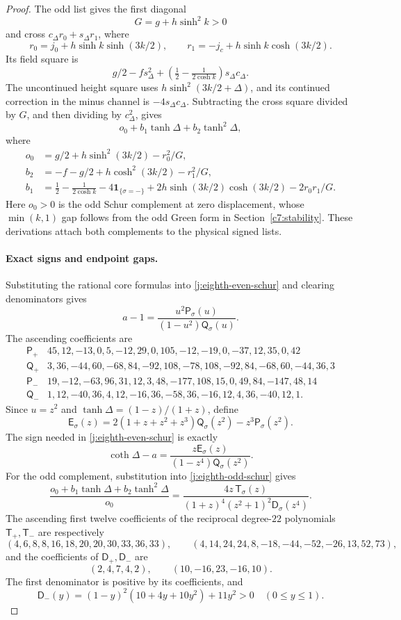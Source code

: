 \begin{proof}
The odd list gives the first diagonal
\[
G=g+h\sinh^2 k>0
\]
and cross \(c_\Delta r_0+s_\Delta r_1\), where
\[
r_0=j_0+h\sinh k\sinh(3k/2),\qquad
r_1=-j_c+h\sinh k\cosh(3k/2).
\]
Its field square is
\[
g/2-fs_\Delta^2+
\left(\tfrac12-\tfrac1{2\cosh k}\right)s_\Delta c_\Delta.
\]
The uncontinued height square uses
\(h\sinh^2(3k/2+\Delta)\), and its continued correction in the minus channel is
\(-4s_\Delta c_\Delta\). Subtracting the cross square divided by \(G\), and then dividing by \(c_\Delta^2\), gives
\begin{equation}\label{j:eighth-odd-schur}
o_0+b_1\tanh\Delta+b_2\tanh^2\Delta,
\end{equation}
where
\[
\begin{aligned}
o_0&=g/2+h\sinh^2(3k/2)-r_0^2/G,\\
b_2&=-f-g/2+h\cosh^2(3k/2)-r_1^2/G,\\
b_1&=\tfrac12-\tfrac1{2\cosh k}-4\mathbf1_{\{\sigma=-\}}
+2h\sinh(3k/2)\cosh(3k/2)-2r_0r_1/G.
\end{aligned}
\]
Here \(o_0>0\) is the odd Schur complement at zero displacement, whose \(\min(k,1)\) gap follows from the odd Green form in Section~\ref{c7:stability}. These derivations attach both complements to the physical signed lists.

\paragraph{Exact signs and endpoint gaps.}
Substituting the rational core formulas into \eqref{j:eighth-even-schur} and clearing denominators gives
\[
a-1=\frac{u^2\mathsf P_\sigma(u)}
{(1-u^2)\mathsf Q_\sigma(u)}.
\]
The ascending coefficients are
\[
\begin{array}{l|l}
\mathsf P_+&45,12,-13,0,5,-12,29,0,105,-12,-19,0,-37,12,35,0,42\\
\mathsf Q_+&3,36,-44,60,-68,84,-92,108,-78,108,-92,84,-68,60,-44,36,3\\
\mathsf P_-&19,-12,-63,96,31,12,3,48,-177,108,15,0,49,84,-147,48,14\\
\mathsf Q_-&1,12,-40,36,4,12,-16,36,-58,36,-16,12,4,36,-40,12,1 .
\end{array}
\]
Since \(u=z^2\) and \(\tanh\Delta=(1-z)/(1+z)\), define
\[
\mathsf E_\sigma(z)
=2(1+z+z^2+z^3)\mathsf Q_\sigma(z^2)
-z^3\mathsf P_\sigma(z^2).
\]
The sign needed in \eqref{j:eighth-even-schur} is exactly
\[
\coth\Delta-a
=\frac{z\mathsf E_\sigma(z)}
{(1-z^4)\mathsf Q_\sigma(z^2)}.
\]
For the odd complement, substitution into \eqref{j:eighth-odd-schur} gives
\[
\frac{o_0+b_1\tanh\Delta+b_2\tanh^2\Delta}{o_0}
=\frac{4z\,\mathsf T_\sigma(z)}
{(1+z)^4(z^2+1)^2\mathsf D_\sigma(z^4)}.
\]
The ascending first twelve coefficients of the reciprocal degree-\(22\) polynomials \(\mathsf T_+,\mathsf T_-\) are respectively
\[
(4,6,8,8,16,18,20,20,30,33,36,33),\qquad
(4,14,24,24,8,-18,-44,-52,-26,13,52,73),
\]
and the coefficients of \(\mathsf D_+,\mathsf D_-\) are
\[
(2,4,7,4,2),\qquad (10,-16,23,-16,10).
\]
The first denominator is positive by its coefficients, and
\[
\mathsf D_-(y)=(1-y)^2(10+4y+10y^2)+11y^2>0
\quad(0\le y\le1).
\]


\end{proof}
